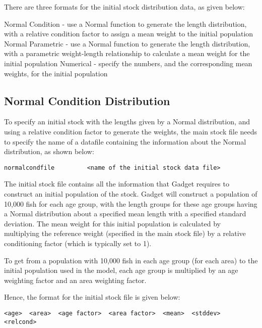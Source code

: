 \documentclass[10pt,twoside]{book}
\begin{document}
\bigskip
There are three formats for the initial stock distribution data, as given below:

\bigskip
Normal Condition - use a Normal function to generate the length distribution, with a relative condition factor to assign a mean weight to the initial population\newline
Normal Parametric - use a Normal function to generate the length distribution, with a parametric weight-length relationship to calculate a mean weight for the initial population\newline
Numerical - specify the numbers, and the corresponding mean weights, for the initial population

\subsection{Normal Condition Distribution}
To specify an initial stock with the lengths given by a Normal distribution, and using a relative condition factor to generate the weights, the main stock file needs to specify the name of a datafile containing the information about the Normal distribution, as shown below:

{\small\begin{verbatim}
normalcondfile         <name of the initial stock data file>
\end{verbatim}}

The initial stock file contains all the information that Gadget requires to construct an initial population of the stock.  Gadget will construct a population of 10,000 fish for each age group, with the length groups for these age groups having a Normal distribution about a specified mean length with a specified standard deviation.  The mean weight for this initial population is calculated by multiplying the reference weight (specified in the main stock file) by a relative conditioning factor (which is typically set to 1).

\bigskip
To get from a population with 10,000 fish in each age group (for each area) to the initial population used in the model, each age group is multiplied by an age weighting factor and an area weighting factor.

\bigskip
Hence, the format for the initial stock file is given below:

{\small\begin{verbatim}
<age>  <area>  <age factor>  <area factor>  <mean>  <stddev>  <relcond>
\end{verbatim}}
\end{document}
